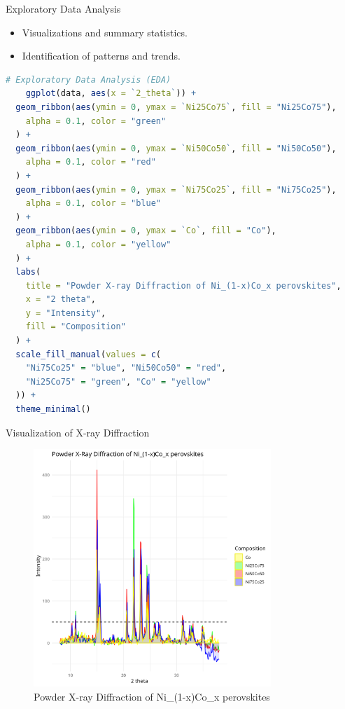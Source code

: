 \documentclass{beamer}
\begin{document}
\begin{frame}[fragile]{Exploratory Data Analysis}
    \begin{itemize}
        \item Visualizations and summary statistics.
        \item Identification of patterns and trends.
    \end{itemize}

    \begin{lstlisting}[language=R, basicstyle=\tiny\ttfamily]
    # Exploratory Data Analysis (EDA)
    ggplot(data, aes(x = `2_theta`)) +
  geom_ribbon(aes(ymin = 0, ymax = `Ni25Co75`, fill = "Ni25Co75"),
    alpha = 0.1, color = "green"
  ) +
  geom_ribbon(aes(ymin = 0, ymax = `Ni50Co50`, fill = "Ni50Co50"),
    alpha = 0.1, color = "red"
  ) +
  geom_ribbon(aes(ymin = 0, ymax = `Ni75Co25`, fill = "Ni75Co25"),
    alpha = 0.1, color = "blue"
  ) +
  geom_ribbon(aes(ymin = 0, ymax = `Co`, fill = "Co"),
    alpha = 0.1, color = "yellow"
  ) +
  labs(
    title = "Powder X-ray Diffraction of Ni_(1-x)Co_x perovskites",
    x = "2 theta",
    y = "Intensity",
    fill = "Composition"
  ) +
  scale_fill_manual(values = c(
    "Ni75Co25" = "blue", "Ni50Co50" = "red",
    "Ni25Co75" = "green", "Co" = "yellow"
  )) +
  theme_minimal()
    \end{lstlisting}
\end{frame}


\begin{frame}{Visualization of X-ray Diffraction}
    \begin{figure}
        \centering
        \includegraphics[width=0.8\textwidth]{../plot/graph.png}
        \caption{Powder X-ray Diffraction of Ni\_(1-x)Co\_x perovskites}
        \label{fig:xrd}
    \end{figure}
\end{frame}
\end{document}
